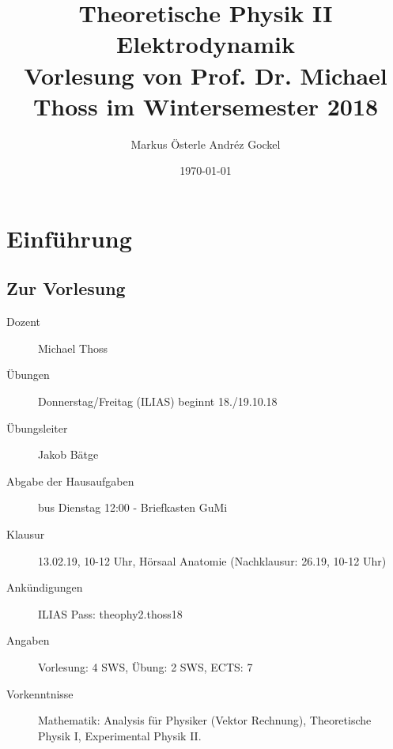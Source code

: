 \documentclass[titlepage,11pt,a4paper,ngerman]{report}
\begin{document}

\title{
	{\Huge Theoretische Physik II\\[3pt]Elektrodynamik}\\[1em]
	{\Large Vorlesung von Prof. Dr. Michael Thoss im Wintersemester 2018}}
\author{Markus Österle \hspace{5pt} Andréz Gockel}
\date{ \today}%
\maketitle
\tableofcontents

\setcounter{chapter}{-1}
\chapter{Einführung}

%
%

\section{Zur Vorlesung}

\begin{description}
	\item[Dozent] Michael Thoss
	\item[Übungen] Donnerstag/Freitag (ILIAS) beginnt 18./19.10.18
	\item[Übungsleiter] Jakob Bätge
	\item[Abgabe der Hausaufgaben] bus Dienstag 12:00 - Briefkasten GuMi
	\item[Klausur] 13.02.19, 10-12 Uhr, Hörsaal Anatomie (Nachklausur: 26.19, 10-12 Uhr)
	\item[Ankündigungen] ILIAS Pass: theophy2.thoss18
	\item[Angaben] Vorlesung: 4 SWS, Übung: 2 SWS, ECTS: 7 
	\item[Vorkenntnisse] Mathematik: Analysis für Physiker (Vektor Rechnung), Theoretische Physik I, Experimental Physik II. 
\end{description}
\end{document}
